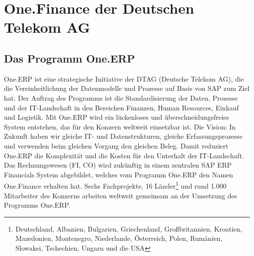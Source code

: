 \section{One.Finance der Deutschen Telekom AG}
\subsection{Das Programm One.ERP}
One.ERP ist eine strategische Initiative der DTAG (Deutsche Telekom AG), die die Vereinheitlichung der Datenmodelle und Prozesse auf Basis von SAP zum Ziel hat. Der Auftrag des Programms ist die Standardisierung der Daten, Prozesse und der IT-Landschaft in den Bereichen Finanzen, Human Resources, Einkauf und Logistik. Mit One.ERP wird ein lückenloses und überschneidungsfreies System entstehen, das für den Konzern weltweit einsetzbar ist. Die Vision: In Zukunft haben wir gleiche IT- und Datenstrukturen, gleiche Erfassungsprozesse und verwenden beim gleichen Vorgang den gleichen Beleg. Damit reduziert One.ERP die Komplexität und die Kosten für den Unterhalt der IT-Landschaft. Das Rechnungswesen (FI, CO) wird zukünftig in einem zentralen SAP ERP Financials System abgebildet, welches vom Programm One.ERP den Namen One.Finance erhalten hat. Sechs Fachprojekte, 16 Länder\footnote{Deutschland, Albanien, Bulgarien, Griechenland, Großbritannien, Kroatien, Mazedonien, Montenegro, Niederlande, Österreich, Polen, Rumänien, Slowakei, Tschechien, Ungarn und die USA} und rund 1.000 Mitarbeiter des Konzerns arbeiten weltweit gemeinsam an der Umsetzung des Programms One.ERP.

